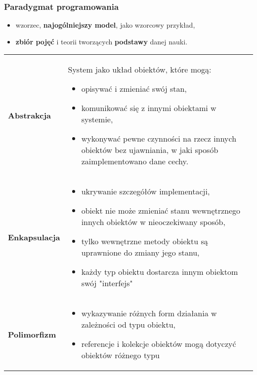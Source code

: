 \documentclass[a4paper]{article}
\begin{document}
    \subsubsection{Paradygmat programowania}
    \begin{itemize}
        \item wzorzec, \textbf{najogólniejszy model}, jako wzorcowy przykład,
        \item \textbf{zbiór pojęć} i teorii tworzących \textbf{podstawy} danej nauki.
    \end{itemize}

    \begin{table}[H]
        \begin{center}
            \begin{tabular}{  p{3cm} p{12cm}  }
                \textbf{Abstrakcja} &
                System jako układ obiektów, które mogą:
                \begin{itemize}
                    \item opisywać i zmieniać swój stan,
                    \item komunikować się z innymi obiektami w systemie,
                    \item wykonywać pewne czynności na rzecz innych obiektów bez ujawniania, w jaki sposób zaimplementowano
                    dane cechy.
                \end{itemize} \\


                \textbf{Enkapsulacja}
                &
                \begin{itemize}
                    \item ukrywanie szczegółów implementacji,
                    \item obiekt nie może zmieniać stanu wewnętrznego innych obiektów w nieoczekiwany sposób,
                    \item tylko wewnętrzne metody obiektu są uprawnione do zmiany jego stanu,
                    \item każdy typ obiektu dostarcza innym obiektom swój "interfejs"
                \end{itemize} \\


                \textbf{Polimorfizm}
                &
                \begin{itemize}
                    \item wykazywanie różnych form działania w zależności od typu obiektu,
                    \item referencje i kolekcje obiektów mogą dotyczyć obiektów różnego typu
                \end{itemize} \\



\end{tabular}
\end{center}
\end{table}
\end{document}
